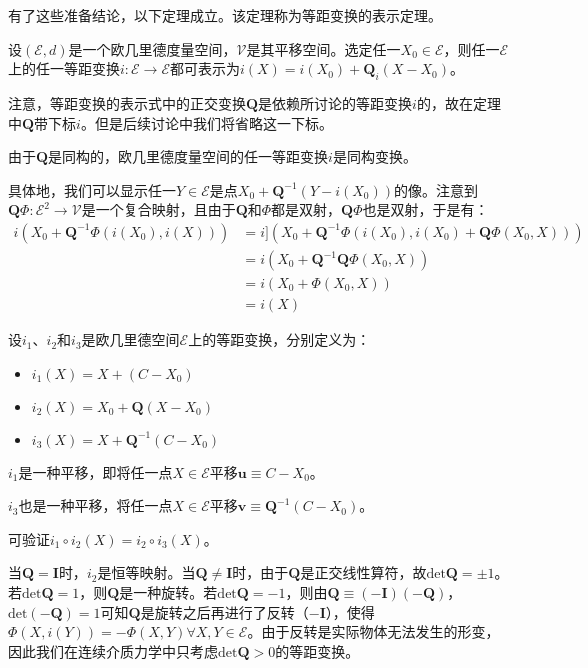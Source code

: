 \documentclass[main.tex]{subfiles}
\begin{document}
有了这些准备结论，以下定理成立。该定理称为等距变换的表示定理。

\begin{theorem}[等距变换的表示定理]\label{thm:II.11.4}
设$\left(\mathcal{E},d\right)$是一个欧几里德度量空间，$\mathcal{V}$是其平移空间。选定任一$X_0\in\mathcal{E}$，则任一$\mathcal{E}$上的任一等距变换$i:\mathcal{E}\rightarrow\mathcal{E}$都可表示为$i\left(X\right)=i\left(X_0\right)+\mathbf{Q}_i\left(X-X_0\right)$。
\end{theorem}

注意，等距变换的表示式中的正交变换$\mathbf{Q}$是依赖所讨论的等距变换$i$的，故在定理中$\mathbf{Q}$带下标$i$。但是后续讨论中我们将省略这一下标。

由于$\mathbf{Q}$是同构的，欧几里德度量空间的任一等距变换$i$是同构变换。

具体地，我们可以显示任一$Y\in\mathcal{E}$是点$X_0+\mathbf{Q}^{-1}\left(Y-i\left(X_0\right)\right)$的像。注意到$\mathbf{Q}\Phi:\mathcal{E}^2\rightarrow\mathcal{V}$是一个复合映射，且由于$\mathbf{Q}$和$\Phi$都是双射，$\mathbf{Q}\Phi$也是双射，于是有：
\begin{align*}
    i\left(X_0+\mathbf{Q}^{-1}\Phi\left(i\left(X_0\right),i\left(X\right)\right)\right)&=i]\left(X_0+\mathbf{Q}^{-1}\Phi\left(i\left(X_0\right),i\left(X_0\right)+\mathbf{Q}\Phi\left(X_0,X\right)\right)\right)\\
    &=i\left(X_0+\mathbf{Q}^{-1}\mathbf{Q}\Phi\left(X_0,X\right)\right)\\
    &=i\left(X_0+\Phi\left(X_0,X\right)\right)\\
    &=i\left(X\right)
\end{align*}

\begin{example}
设$i_1$、$i_2$和$i_3$是欧几里德空间$\mathcal{E}$上的等距变换，分别定义为：
\begin{itemize}
    \item $i_1\left(X\right)=X+\left(C-X_0\right)$
    \item $i_2\left(X\right)=X_0+\mathbf{Q}\left(X-X_0\right)$
    \item $i_3\left(X\right)=X+\mathbf{Q}^{-1}\left(C-X_0\right)$
\end{itemize}

$i_1$是一种平移，即将任一点$X\in\mathcal{E}$平移$\mathbf{u}\equiv C-X_0$。

$i_3$也是一种平移，将任一点$X\in\mathcal{E}$平移$\mathbf{v}\equiv \mathbf{Q}^{-1}\left(C-X_0\right)$。

可验证$i_1\circ i_2\left(X\right)=i_2\circ i_3\left(X\right)$。

当$\mathbf{Q}=\mathbf{I}$时，$i_2$是恒等映射。当$\mathbf{Q}\neq\mathbf{I}$时，由于$\mathbf{Q}$是正交线性算符，故$\mathrm{det}\mathbf{Q}=\pm 1$。若$\mathrm{det}\mathbf{Q}=1$，则$\mathbf{Q}$是一种旋转。若$\mathrm{det}\mathbf{Q}=-1$，则由$\mathbf{Q}\equiv\left(-\mathbf{I}\right)\left(-\mathbf{Q}\right)$，$\mathrm{det}\left(-\mathbf{Q}\right)=1$可知$\mathbf{Q}$是旋转之后再进行了反转（$-\mathbf{I}$），使得$\Phi\left(X,i\left(Y\right)\right)=-\Phi\left(X,Y\right)\forall X,Y\in\mathcal{E}$。由于反转是实际物体无法发生的形变，因此我们在连续介质力学中只考虑$\mathrm{det}\mathbf{Q}>0$的等距变换。
\end{example}
\end{document}
